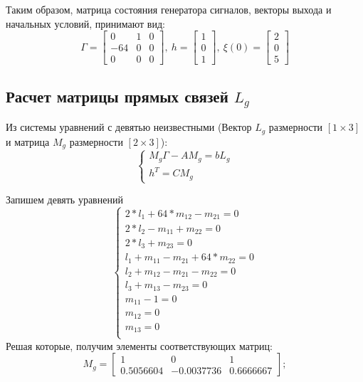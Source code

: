 Таким образом, матрица состояния генератора сигналов, векторы выхода и начальных условий, принимают вид:
\begin{equation}
	\Gamma = 
	\begin{bmatrix}
		0 & 1 & 0 \\
		-64 & 0 & 0 \\
		0 & 0 & 0
	\end{bmatrix}\!\!,~
	h = 
	\begin{bmatrix}
		1\\ 
		0\\
		1
	\end{bmatrix}\!\!,~
	\xi(0) = 
	\begin{bmatrix}
		2\\
		0\\
		5
	\end{bmatrix}
\end{equation}

\subsection{Расчет матрицы прямых связей $L_g$}
Из системы уравнений с девятью неизвестными (Вектор $L_g$ размерности $[1 \times 3]$ и матрица $M_g$ размерности $[2 \times 3]$):
\begin{equation}
	\begin{cases}
		M_g \Gamma - A M_g = b L_g \\
		h^T = C M_g
	\end{cases}
\end{equation}

Запишем девять уравнений
\begin{equation}
	\begin{cases}
		2*l_1 + 64*m_{12} - m_{21} = 0 \\
		2*l_2 - m_{11} + m_{22} = 0 \\
		2*l_3 + m_{23} = 0 \\
		l_1 + m_{11} - m_{21} + 64*m_{22} = 0 \\
		l_2 + m_{12} - m_{21} - m_{22} = 0 \\
		l_3 + m_{13} - m_{23} = 0 \\
		m_{11} - 1 = 0 \\
		m_{12} = 0 \\
		m_{13} = 0 \\
	\end{cases}
\end{equation}
Решая которые, получим элементы соответствующих матриц:
\begin{equation}
	M_g = 
	\begin{bmatrix}
		1 &          0 &          1 \\
		0.5056604 & -0.0037736 &  0.6666667
	\end{bmatrix}\!\!;
\end{equation}

